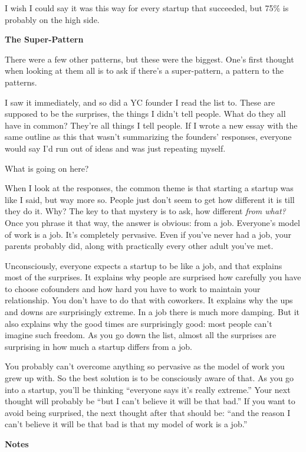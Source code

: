 I wish I could say it was this way for every startup that succeeded, but
75\% is probably on the high side.

\textbf{The Super-Pattern}

There were a few other patterns, but these were the biggest. One's first
thought when looking at them all is to ask if there's a super-pattern, a
pattern to the patterns.

I saw it immediately, and so did a YC founder I read the list to. These
are supposed to be the surprises, the things I didn't tell people. What
do they all have in common? They're all things I tell people. If I wrote
a new essay with the same outline as this that wasn't summarizing the
founders' responses, everyone would say I'd run out of ideas and was
just repeating myself.

What is going on here?

When I look at the responses, the common theme is that starting a
startup was like I said, but way more so. People just don't seem to get
how different it is till they do it. Why? The key to that mystery is to
ask, how different \emph{from what?} Once you phrase it that way, the
answer is obvious: from a job. Everyone's model of work is a job. It's
completely pervasive. Even if you've never had a job, your parents
probably did, along with practically every other adult you've met.

Unconsciously, everyone expects a startup to be like a job, and that
explains most of the surprises. It explains why people are surprised how
carefully you have to choose cofounders and how hard you have to work to
maintain your relationship. You don't have to do that with coworkers. It
explains why the ups and downs are surprisingly extreme. In a job there
is much more damping. But it also explains why the good times are
surprisingly good: most people can't imagine such freedom. As you go
down the list, almost all the surprises are surprising in how much a
startup differs from a job.

You probably can't overcome anything so pervasive as the model of work
you grew up with. So the best solution is to be consciously aware of
that. As you go into a startup, you'll be thinking ``everyone says it's
really extreme.'' Your next thought will probably be ``but I can't
believe it will be that bad.'' If you want to avoid being surprised, the
next thought after that should be: ``and the reason I can't believe it
will be that bad is that my model of work is a job.''

\textbf{Notes}

